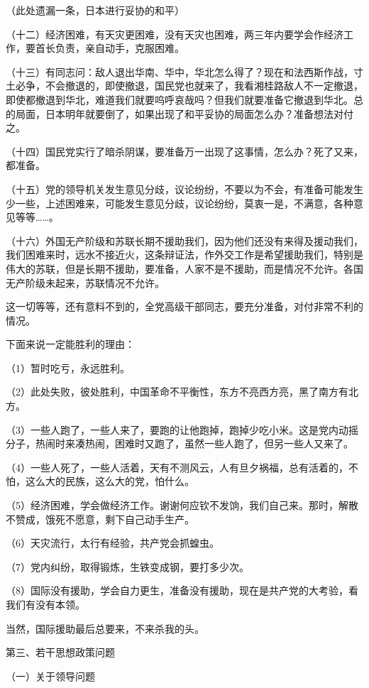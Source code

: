 （此处遗漏一条，日本进行妥协的和平）

（十二）经济困难，有天灾更困难，没有天灾也困难，两三年内要学会作经济工作，要首长负责，亲自动手，克服困难。

（十三）有同志问：敌人退出华南、华中，华北怎么得了？现在和法西斯作战，寸土必争，不会撤退的，即使撤退，国民党也就来了，我看湘桂路敌人不一定撤退，即使都撤退到华北，难道我们就要呜呼哀哉吗？但我们就要准备它撤退到华北。总的局面，日本明年就要倒了，如果出现了和平妥协的局面怎么办？准备想法对付之。

（十四）国民党实行了暗杀阴谋，要准备万一出现了这事情，怎么办？死了又来，都准备。

（十五）党的领导机关发生意见分歧，议论纷纷，不要以为不会，有准备可能发生少一些，上述困难来，可能发生意见分歧，议论纷纷，莫衷一是，不满意，各种意见等等……。

（十六）外国无产阶级和苏联长期不援助我们，因为他们还没有来得及援动我们，我们困难来时，远水不接近火，这条辩证法，作外交工作是希望援助我们，特别是伟大的苏联，但是长期不援助，要准备，人家不是不援助，而是情况不允许。各国无产阶级未起来，苏联情况不允许。

这一切等等，还有意料不到的，全党高级干部同志，要充分准备，对付非常不利的情况。

下面来说一定能胜利的理由：

（1）暂时吃亏，永远胜利。

（2）此处失败，彼处胜利，中国革命不平衡性，东方不亮西方亮，黑了南方有北方。

（3）一些人跑了，一些人来了，要跑的让他跑掉，跑掉少吃小米。这是党内动摇分子，热闹时来凑热闹，困难时又跑了，虽然一些人跑了，但另一些人又来了。

（4）一些人死了，一些人活着，天有不测风云，人有旦夕祸福，总有活着的，不怕，这么大的民族，这么大的党，怕什么。

（5）经济困难，学会做经济工作。谢谢何应钦不发饷，我们自己来。那时，解散不赞成，饿死不愿意，剩下自己动手生产。

（6）天灾流行，太行有经验，共产党会抓蝗虫。

（7）党内纠纷，取得锻炼，生铁变成钢，要打多少次。

（8）国际没有援助，学会自力更生，准备没有援助，现在是共产党的大考验，看我们有没有本领。

当然，国际援助最后总要来，不来杀我的头。

第三、若干思想政策问题

（一）关于领导问题

